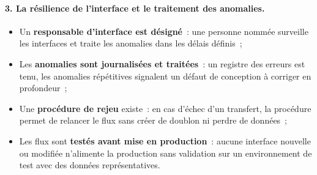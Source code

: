 \paragraph{3. La résilience de l'interface et le traitement des anomalies.}
\begin{itemize}
    \item Un \textbf{responsable d'interface est désigné}~: une personne nommée
        surveille les interfaces et traite les anomalies dans les délais définis~;
    \item Les \textbf{anomalies sont journalisées et traitées}~: un registre des
        erreurs est tenu, les anomalies répétitives signalent un défaut de conception
        à corriger en profondeur~;
    \item Une \textbf{procédure de rejeu} existe~: en cas d'échec d'un transfert,
        la procédure permet de relancer le flux sans créer de doublon ni perdre de
        données~;
    \item Les flux sont \textbf{testés avant mise en production}~: aucune interface
        nouvelle ou modifiée n'alimente la production sans validation sur un
        environnement de test avec des données représentatives.
\end{itemize}

